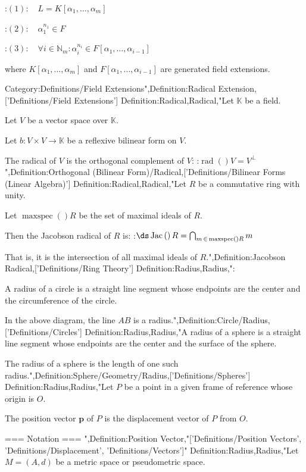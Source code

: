 :$(1): \quad L = K \left[ \alpha_1, \ldots, \alpha_m \right]$

:$(2): \quad \alpha_1^{n_1} \in F$

:$(3): \quad \forall i \in \mathbb N_m: \alpha_i^{n_i} \in F \left[ \alpha_1, \ldots, \alpha_{i-1}  \right]$

where $K \left[ \alpha_1, \ldots, \alpha_m \right]$ and $F \left[ \alpha_1, \ldots, \alpha_{i-1}  \right]$ are generated field extensions.

Category:Definitions/Field Extensions",Definition:Radical Extension,['Definitions/Field Extensions']
Definition:Radical,Radical,"Let $\mathbb K$ be a field.

Let $V$ be a vector space over $\mathbb K$.

Let $b : V\times V \to \mathbb K$ be a reflexive bilinear form on $V$.


The radical of $V$ is the orthogonal complement of $V$:
:$\operatorname {rad}  \left(   \right)V = V^\perp$",Definition:Orthogonal (Bilinear Form)/Radical,['Definitions/Bilinear Forms (Linear Algebra)']
Definition:Radical,Radical,"Let $R$ be a commutative ring with unity.

Let $\operatorname{maxspec} \left(   \right)R$ be the set of maximal ideals of $R$.


Then the Jacobson radical of $R$ is:
:$\ds \operatorname {Jac}  \left(   \right)R = \bigcap_{m \mathop \in \operatorname{maxspec} \left(   \right)R} m$

That is, it is the intersection of all maximal ideals of $R$.",Definition:Jacobson Radical,['Definitions/Ring Theory']
Definition:Radius,Radius,":

A radius of a circle is a straight line segment whose endpoints are the center and the circumference of the circle.

In the above diagram, the line $AB$ is a radius.",Definition:Circle/Radius,['Definitions/Circles']
Definition:Radius,Radius,"A radius of a sphere is a straight line segment whose endpoints are the center and the surface of the sphere.

The radius of a sphere is the length of one such radius.",Definition:Sphere/Geometry/Radius,['Definitions/Spheres']
Definition:Radius,Radius,"Let $P$ be a point in a given frame of reference whose origin is $O$.

The position vector $\mathbf p$ of $P$ is the displacement vector of $P$ from $O$.


=== Notation ===
",Definition:Position Vector,"['Definitions/Position Vectors', 'Definitions/Displacement', 'Definitions/Vectors']"
Definition:Radius,Radius,"Let $M = \left( A, d \right)$ be a metric space or pseudometric space.

